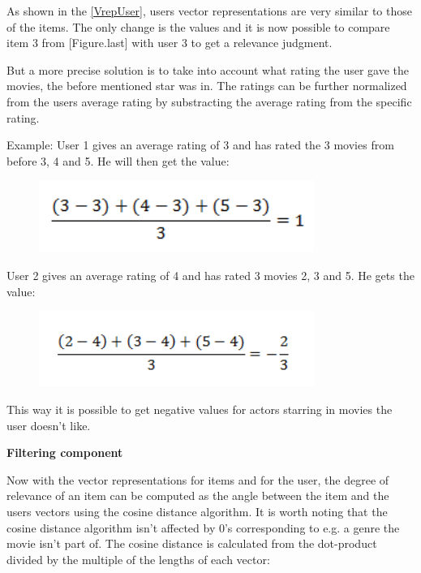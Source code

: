 As shown in the \ref{VrepUser}, users vector representations are very similar to those of the items. The only change is the values and it is now possible to compare item 3 from [Figure.last] with user 3 to get a relevance judgment.

But a more precise solution is to take into account what rating the user gave the movies, the before mentioned star was in. The ratings can be further normalized from the users average rating by substracting the average rating from the specific rating.

Example:
User 1 gives an average rating of 3 and has rated the 3 movies from before 3, 4 and 5. He will then get the value:

\begin{figure}[H]
\centering
\includegraphics[width=0.8\textwidth]{Images/Userfeature1.png}
\caption{}
\label{Feature1}
\end{figure}

User 2 gives an average rating of 4 and has rated 3 movies 2, 3 and 5. He gets the value:

\begin{figure}[H]
\centering
\includegraphics[width=0.8\textwidth]{Images/Userfeature2.png}
\caption{}
\label{Feature2}
\end{figure}

This way it is possible to get negative values for actors starring in movies the user doesn't like.

 
\textbf{Filtering component}

Now with the vector representations for items and for the user, the degree of relevance of an item can be computed as the angle between the item and the users vectors using the cosine distance algorithm. It is worth noting that the cosine distance algorithm isn't affected by 0's corresponding to e.g. a genre the movie isn't part of. The cosine distance is calculated from the dot-product divided by the multiple of the lengths of each vector:

